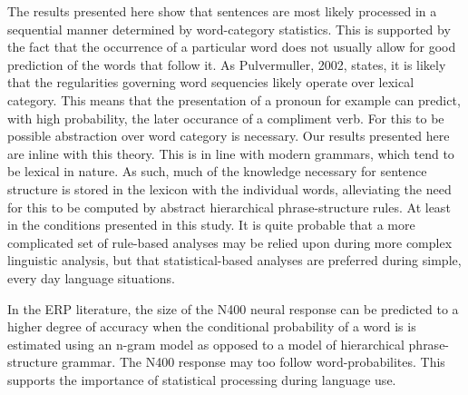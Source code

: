 \documentclass[10pt,letterpaper]{article}
\begin{document}
The results presented here show that sentences are most likely
processed in a sequential manner determined by word-category
statistics. 
%
%
 This is supported by the fact that the occurrence of a
particular word does not usually allow for good prediction of the
words that follow it. As Pulvermuller, 2002, states, it is likely that
the regularities governing word sequencies likely operate over lexical
category. This means that the presentation of a pronoun for example
can predict, with high probability, the later occurance of a
compliment verb. For this to be possible abstraction over word category is
necessary. Our results presented here are inline with this
theory. 
%
%
This is in line with modern grammars, which tend to be lexical in
nature. As such, much of the knowledge necessary for sentence
structure is stored in the lexicon with the individual words,
alleviating the need for this to be computed by abstract hierarchical
phrase-structure rules. At least in the conditions presented in this
study. It is quite probable that a more complicated set of rule-based
analyses may be relied upon during more complex linguistic analysis,
but that statistical-based analyses are preferred during simple, every
day language situations. 
%
%
%
%

%
%
In the ERP literature, the size of the N400 neural response can be
predicted to a higher degree of accuracy when the conditional
probability of a word is is estimated using an n-gram model as opposed
to a model of hierarchical phrase-structure grammar. The N400 response
may too follow word-probabilites. This supports the importance of
statistical processing during language use.

\end{document}
